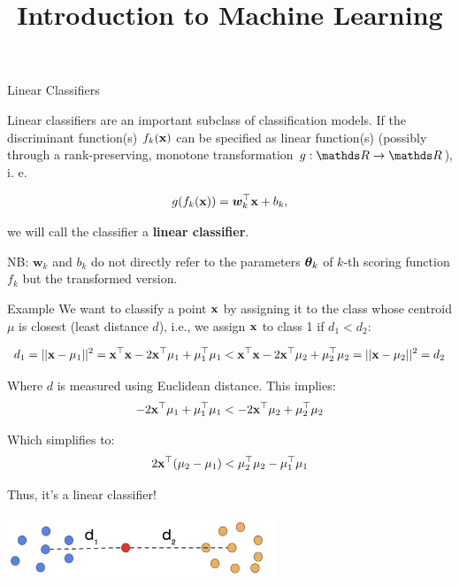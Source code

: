 \documentclass[11pt,compress,t,notes=noshow, xcolor=table]{beamer}
\title{Introduction to Machine Learning}
\begin{document}

\framebreak


\begin{vbframe}{Linear Classifiers}

Linear classifiers are an important subclass of classification models. 
If the discriminant function(s) $f_{k}(\mathbf{x})$ can be specified as linear function(s) (possibly through a rank-preserving,
monotone transformation $g: \R \to \R$), i. e. 

$$
  g(f_{k}(\mathbf{x})) = \bm{w}_k^\top \mathbf{x} + b_k,
$$

we will call the classifier a \textbf{linear classifier}. 

\vfill

NB: $\bm{w}_k$ and $b_k$ do not directly refer to the parameters $\bm{\theta}_k$ 
of $k$-th scoring function $f_k$ but the transformed version. 

\end{vbframe}

\begin{vbframe}{Example}
We want to classify a point $\mathbf{x}$ by assigning it to the class whose centroid $\mu$ is closest (least distance $d$), i.e., we assign $\mathbf{x}$ to class 1 if $d_1 < d_2$:

$$
d_1 = ||\mathbf{x} - \mathbf{\mu}_1||^2 = \mathbf{x}^\top \mathbf{x} - 2 \mathbf{x}^\top \mathbf{\mu}_1 + \mathbf{\mu}_1^\top \mathbf{\mu}_1
< \mathbf{x}^\top \mathbf{x} - 2 \mathbf{x}^\top \mathbf{\mu}_2 + \mathbf{\mu}_2^\top \mathbf{\mu}_2 = ||\mathbf{x} - \mathbf{\mu}_2||^2 = d_2
$$

Where $d$ is measured using Euclidean distance. This implies:
$$
-2 \mathbf{x}^\top \mathbf{\mu}_1 + \mathbf{\mu}_1^\top \mathbf{\mu}_1
< -2 \mathbf{x}^\top \mathbf{\mu}_2 + \mathbf{\mu}_2^\top \mathbf{\mu}_2
$$

Which simplifies to:
$$
2 \mathbf{x}^\top (\mathbf{\mu}_2 - \mathbf{\mu}_1) < \mathbf{\mu}_2^\top \mathbf{\mu}_2 - \mathbf{\mu}_1^\top \mathbf{\mu}_1
$$

Thus, it's a linear classifier!

\begin{center}
\includegraphics[width=0.6\textwidth]{figure_man/centroids.png} 
\end{center}

\end{vbframe}
  
\end{document}
